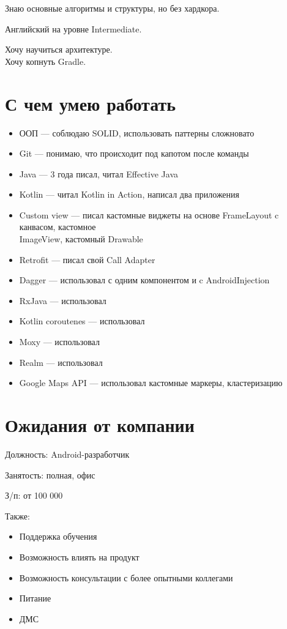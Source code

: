 \documentclass[a4paper,12pt]{article}
\begin{document}
    Знаю основные алгоритмы и структуры, но без хардкора.

    Английский на уровне Intermediate.

    Хочу научиться архитектуре.\\
    Хочу копнуть Gradle.

    \section*{С чем умею работать}%

    \begin{itemize}
        \item ООП --- соблюдаю SOLID, использовать паттерны сложновато
        \item Git --- понимаю, что происходит под капотом после команды
        \item Java --- 3 года писал, читал Effective Java
        \item Kotlin --- читал Kotlin in Action, написал два приложения
        \item Custom view --- писал кастомные виджеты на основе FrameLayout c канвасом, кастомное\\ ImageView, кастомный Drawable
        \item Retrofit --- писал свой Call Adapter
        \item Dagger --- использовал с одним компонентом и c AndroidInjection
        \item RxJava --- использовал
        \item Kotlin coroutenes --- использовал
        \item Moxy --- использовал
        \item Realm --- использовал
        \item Google Maps API --- использовал кастомные маркеры, кластеризацию
    \end{itemize}

    \section*{Ожидания от компании}

    Должность: Android-разработчик\par
    Занятость: полная, офис\par
    З/п: от 100 000\par
    Также:
    \begin{itemize}
        \item Поддержка обучения
        \item Возможность влиять на продукт
        \item Возможность консультации с более опытными коллегами
        \item Питание
        \item ДМС
    \end{itemize}
\end{document}
